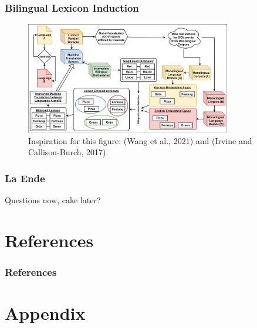 \documentclass[aspectratio=169]{beamer}
\begin{document}
\begin{frame}[fragile]
	\frametitle{Bilingual Lexicon Induction}
    \begin{figure}
        \centering
        \includegraphics[width=0.8\textwidth]{images/ChameleonMT-BLI-BLI.png}
        \caption{Inspiration for this figure: (Wang et al., 2021) and (Irvine and Callison-Burch, 2017).}
    \end{figure}
\end{frame}

\begin{frame}[fragile]
	\frametitle{La Ende}
    \Large Questions now, cake later? 
\end{frame}


\section{References}
\begin{frame}
	\frametitle{References}
    
    \tiny
	
\end{frame}




\section{Appendix}
\end{document}
